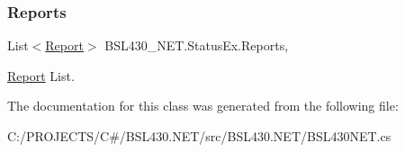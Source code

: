 \mbox{\label{class_b_s_l430___n_e_t_1_1_status_ex_aed3fe7eee33a1e3c254a79d5eabc00b9}} 
\subsubsection{\texorpdfstring{Reports}{Reports}}
{\footnotesize\ttfamily List$<$\mbox{\hyperlink{class_b_s_l430___n_e_t_1_1_report}{Report}}$>$ B\+S\+L430\+\_\+\+N\+E\+T.\+Status\+Ex.\+Reports\hspace{0.3cm}{\ttfamily [get]}, {\ttfamily [set]}}



\mbox{\hyperlink{class_b_s_l430___n_e_t_1_1_report}{Report}} List. 



The documentation for this class was generated from the following file\+:\begin{DoxyCompactItemize}
\item 
C\+:/\+P\+R\+O\+J\+E\+C\+T\+S/\+C\#/\+B\+S\+L430.\+N\+E\+T/src/\+B\+S\+L430.\+N\+E\+T/B\+S\+L430\+N\+E\+T.\+cs\end{DoxyCompactItemize}
